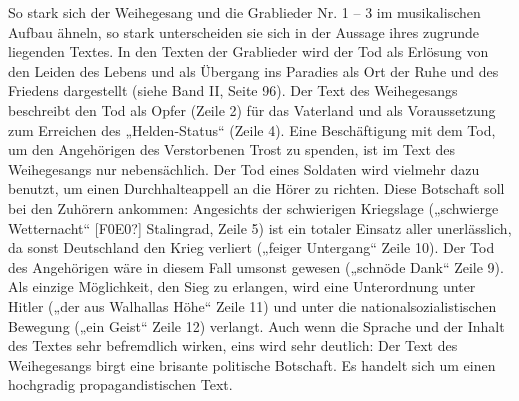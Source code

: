So stark sich der Weihegesang und die Grablieder Nr. 1 – 3 im
musikalischen Aufbau ähneln, so stark unterscheiden sie sich in der
Aussage ihres zugrunde liegenden Textes. In den Texten der Grablieder
wird der Tod als Erlösung von den Leiden des Lebens und als Übergang
ins Paradies als Ort der Ruhe und des Friedens dargestellt (siehe Band
II, Seite 96). Der Text des Weihegesangs beschreibt den Tod als Opfer
(Zeile 2) für das Vaterland und als Voraussetzung zum Erreichen des
„Helden-Status“ (Zeile 4). Eine Beschäftigung mit dem Tod, um den
Angehörigen des Verstorbenen Trost zu spenden, ist im Text des
Weihegesangs nur nebensächlich. Der Tod eines Soldaten wird vielmehr
dazu benutzt, um einen Durchhalteappell an die Hörer zu richten. Diese
Botschaft soll bei den Zuhörern ankommen: Angesichts der schwierigen
Kriegslage („schwierge Wetternacht“ [F0E0?] Stalingrad, Zeile 5) ist
ein totaler Einsatz aller unerlässlich, da sonst Deutschland den Krieg
verliert („feiger Untergang“ Zeile 10). Der Tod des Angehörigen wäre in
diesem Fall umsonst gewesen („schnöde Dank“ Zeile 9). Als einzige
Möglichkeit, den Sieg zu erlangen, wird eine Unterordnung unter Hitler
(„der aus Walhallas Höhe“ Zeile 11) und unter die
nationalsozialistischen Bewegung („ein Geist“ Zeile 12) verlangt. Auch
wenn die Sprache und der Inhalt des Textes sehr befremdlich wirken,
eins wird sehr deutlich: Der Text des Weihegesangs birgt eine brisante
politische Botschaft. Es handelt sich um einen hochgradig
propagandistischen Text.

